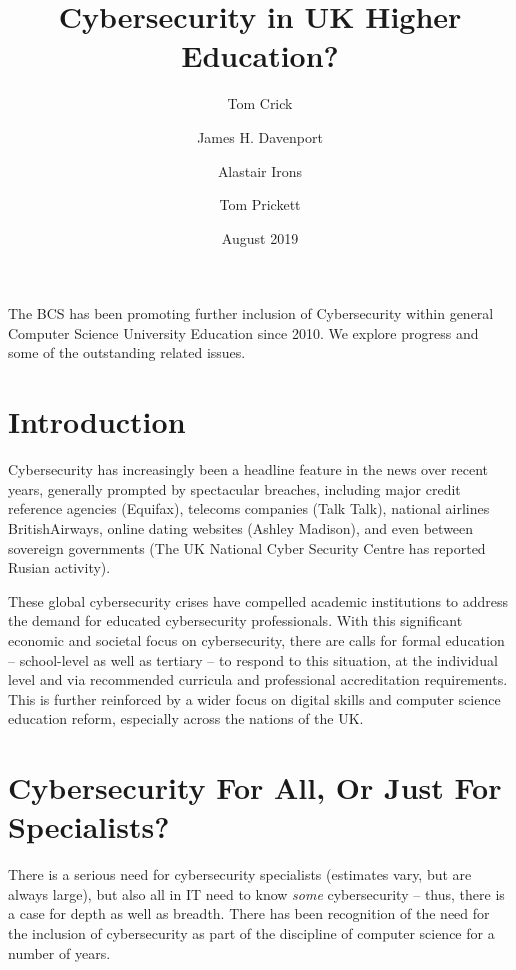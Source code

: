 \documentclass[a4paper,11pt]{article}
\title{Cybersecurity in UK Higher Education?}
\author[1]{Tom Crick}
\author[2]{James H. Davenport}
\author[3]{Alastair Irons}
\author[4]{Tom Prickett}
\affil[1]{Swansea University, Swansea, UK}
\affil[2]{University of Bath, Bath, UK}
\affil[3]{Sunderland University, Sunderland, UK}
\affil[4]{Northumbria University, Newcastle upon Tyne, UK}
\affil[1]{\url{thomas.crick@swansea.ac.uk}}
\affil[2]{\url{j.h.davenport@bath.ac.uk}}
\affil[3]{\url{alastair.irons@sunderland.ac.uk}}
\affil[4]{\url{tom.prickett@northumbria.ac.uk}}
\date{August 2019}
\begin{document}
\maketitle


\begin{strapline}
The BCS has been promoting further inclusion of Cybersecurity within general Computer Science University Education since 2010. We explore progress and some of the outstanding related issues.

\end{strapline}




\section*{Introduction}

Cybersecurity has increasingly been a headline feature in the news over recent years, generally prompted by spectacular breaches, including major credit reference agencies (Equifax), telecoms companies (Talk Talk), national airlines BritishAirways, online dating websites (Ashley Madison), and even between sovereign governments (The UK National Cyber Security  Centre has reported Rusian activity). 

These global cybersecurity crises have compelled academic institutions to address the demand for educated cybersecurity professionals.  With this significant economic and societal focus on cybersecurity, there are calls for formal education -- school-level as well as tertiary -- to respond to this situation, at the individual level and via recommended curricula and professional accreditation requirements. This is further reinforced by a wider focus on digital skills and computer science education reform, especially across the nations of the UK. 

\section*{Cybersecurity For All, Or Just For Specialists?}

There is a serious need for cybersecurity specialists (estimates vary, but are always large), but also all in IT need to know \emph{some} cybersecurity -- thus, there is a case for depth as well as breadth. There has been recognition of the need for the inclusion of cybersecurity as part of the discipline of computer science for a number of years.  
\end{document}
